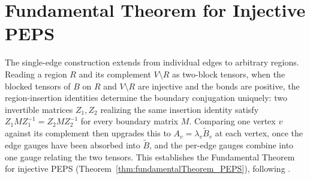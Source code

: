 \section{Fundamental Theorem for Injective PEPS}\label{sec:peps_ft}

The single-edge construction extends from individual edges to arbitrary regions.
Reading a region $R$ and its complement $V\setminus R$ as two-block tensors,
when the blocked tensors of $B$ on $R$ and $V\setminus R$ are injective and the
bonds are positive, the region-insertion identities determine the boundary
conjugation uniquely: two invertible matrices $Z_1,Z_2$ realizing the same
insertion identity satisfy $Z_1 M Z_1^{-1}=Z_2 M Z_2^{-1}$ for every boundary
matrix $M$.
Comparing one vertex $v$ against its complement then upgrades this to
$A_v=\lambda_v\widetilde B_v$ at each vertex, once the edge gauges have been
absorbed into $\widetilde B$, and the per-edge gauges combine into one gauge
relating the two tensors. This establishes the Fundamental Theorem for injective
PEPS (Theorem~\ref{thm:fundamentalTheorem_PEPS}), following
\cite[Theorem~2]{Molnar2018NormalPEPS}.





